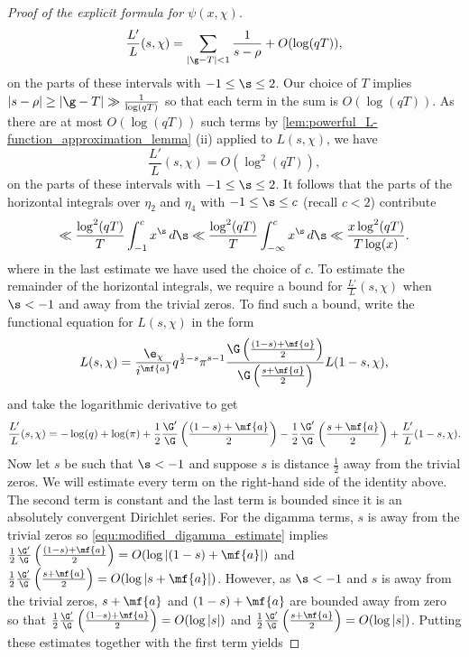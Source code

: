 \begin{proof}[Proof of the explicit formula for \(\psi(x,\chi)\)]
      \[
        \frac{L'}{L}(s,\chi) = \sum_{|\g-T| < 1}\frac{1}{s-\rho}+O(\log(qT)),
      \]
      on the parts of these intervals with \(-1 \le \s \le 2\). Our choice of \(T\) implies \(|s-\rho| \ge |\g-T| \gg \frac{1}{\log(qT)}\) so that each term in the sum is \(O(\log(qT))\). As there are at most \(O(\log(qT))\) such terms by \cref{lem:powerful_L-function_approximation_lemma} (ii) applied to \(L(s,\chi)\), we have
      \[
        \frac{L'}{L}(s,\chi) = O(\log^{2}(qT)),
      \]
      on the parts of these intervals with \(-1 \le \s \le 2\). It follows that the parts of the horizontal integrals over \(\eta_{2}\) and \(\eta_{4}\) with  \(-1 \le \s \le c\) (recall \(c < 2\)) contribute
      \begin{equation}\label{equ:explicit_formula_Dirichlet_proof_8}
        \ll \frac{\log^{2}(qT)}{T}\int_{-1}^{c}x^{\s}\,d\s \ll \frac{\log^{2}(qT)}{T}\int_{-\infty}^{c}x^{\s}\,d\s \ll \frac{x\log^{2}(qT)}{T\log(x)}.
      \end{equation}
      where in the last estimate we have used the choice of \(c\). To estimate the remainder of the horizontal integrals, we require a bound for \(\frac{L'}{L}(s,\chi)\) when \(\s < -1\) and away from the trivial zeros. To find such a bound, write the functional equation for \(L(s,\chi)\) in the form
      \[
        L(s,\chi) = \frac{\e_{\chi}}{i^{\mf{a}}}q^{\frac{1}{2}-s}\pi^{s-1}\frac{\G\left(\frac{(1-s)+\mf{a}}{2}\right)}{\G\left(\frac{s+\mf{a}}{2}\right)}L(1-s,\chi),
      \]
      and take the logarithmic derivative to get
      \[
        \frac{L'}{L}(s,\chi) = -\log(q)+\log(\pi)+\frac{1}{2}\frac{\G'}{\G}\left(\frac{(1-s)+\mf{a}}{2}\right)-\frac{1}{2}\frac{\G'}{\G}\left(\frac{s+\mf{a}}{2}\right)+\frac{L'}{L}(1-s,\chi).
      \]
      Now let \(s\) be such that \(\s < -1\) and suppose \(s\) is distance \(\frac{1}{2}\) away from the trivial zeros. We will estimate every term on the right-hand side of the identity above. The second term is constant and the last term is bounded since it is an absolutely convergent Dirichlet series. For the digamma terms, \(s\) is away from the trivial zeros so \cref{equ:modified_digamma_estimate} implies \(\frac{1}{2}\frac{\G'}{\G}\left(\frac{(1-s)+\mf{a}}{2}\right) = O(\log{|(1-s)+\mf{a}|})\) and \(\frac{1}{2}\frac{\G'}{\G}\left(\frac{s+\mf{a}}{2}\right) = O(\log{|s+\mf{a}|})\). However, as \(\s < -1\) and \(s\) is away from the trivial zeros, \(s+\mf{a}\) and \((1-s)+\mf{a}\) are bounded away from zero so that \(\frac{1}{2}\frac{\G'}{\G}\left(\frac{(1-s)+\mf{a}}{2}\right) = O(\log{|s|})\) and \(\frac{1}{2}\frac{\G'}{\G}\left(\frac{s+\mf{a}}{2}\right) = O(\log{|s|})\). Putting these estimates together with the first term yields

\end{proof}
